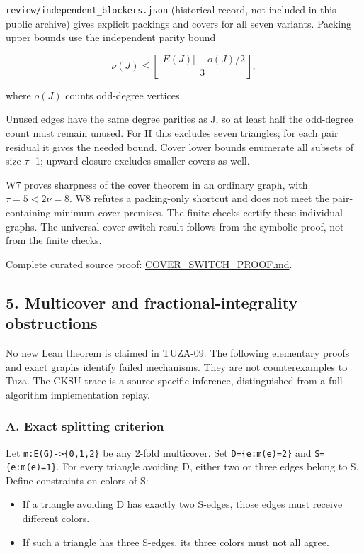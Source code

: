 \documentclass[11pt]{article}
\providecommand{\tightlist}{\setlength{\itemsep}{0pt}\setlength{\parskip}{0pt}}
\begin{document}
\texttt{review/independent\_blockers.json} (historical record, not included in this public archive) gives explicit packings and covers for all seven variants. Packing upper bounds use the independent parity bound

\[\nu(J)\le\left\lfloor\frac{|E(J)|-o(J)/2}{3}\right\rfloor,\]

where \(o(J)\) counts odd-degree vertices.

Unused edges have the same degree parities as J, so at least half the odd-degree count must remain unused. For H this excludes seven triangles; for each pair residual it gives the needed bound. Cover lower bounds enumerate all subsets of size \(\tau\) -1; upward closure excludes smaller covers as well.

W7 proves sharpness of the cover theorem in an ordinary graph, with \(\tau=5<2\nu=8\). W8 refutes a packing-only shortcut and does not meet the pair-containing minimum-cover premises. The finite checks certify these individual graphs. The universal cover-switch result follows from the symbolic proof, not from the finite checks.

Complete curated source proof: \href{https://github.com/pappa211/ai-math-experiments/blob/main/problems/TUZA-08/notes/COVER_SWITCH_PROOF.md}{COVER\_SWITCH\_PROOF.md}.

\subsection{5. Multicover and fractional-integrality obstructions}\label{multicover-and-fractional-integrality-obstructions}

No new Lean theorem is claimed in TUZA-09. The following elementary proofs and exact graphs identify failed mechanisms. They are not counterexamples to Tuza. The CKSU trace is a source-specific inference, distinguished from a full algorithm implementation replay.

\subsubsection{A. Exact splitting criterion}\label{a.-exact-splitting-criterion}

Let \texttt{m:E(G)-\textgreater{}\{0,1,2\}} be any 2-fold multicover. Set \texttt{D=\{e:m(e)=2\}} and \texttt{S=\{e:m(e)=1\}}. For every triangle avoiding D, either two or three edges belong to S. Define constraints on colors of S:

\begin{itemize}
\tightlist
\item
  If a triangle avoiding D has exactly two S-edges, those edges must receive different colors.
\item
  If such a triangle has three S-edges, its three colors must not all agree.
\end{itemize}
\end{document}
